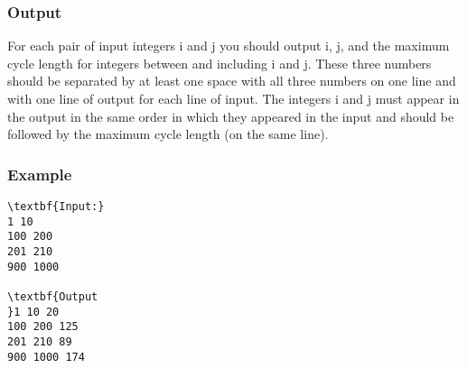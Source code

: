 \subsubsection{Output}

For each pair of input integers i and j you should output  i, j, and the maximum cycle length for integers between and  including i and j. These three numbers should be separated by at least one space with all three numbers on one line and with one line of output for each line of input. The integers i and j must appear in the output in the same order in which they appeared in the input and should be followed by the maximum cycle length (on the same line).

\subsubsection{Example}
\begin{verbatim}
\textbf{Input:}
1 10 
100 200 
201 210 
900 1000

\textbf{Output
}1 10 20
100 200 125
201 210 89
900 1000 174
\end{verbatim}
